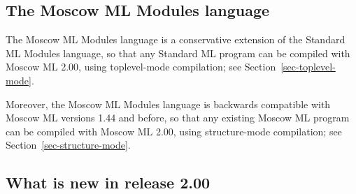 \documentclass[fleqn]{article}
\begin{document}
\subsection{The Moscow ML Modules language}

The Moscow ML Modules language is a conservative extension of the
Standard ML Modules language, so that any Standard ML program can be
compiled with Moscow ML 2.00, using toplevel-mode compilation; see
Section~\ref{sec-toplevel-mode}.

Moreover, the Moscow ML Modules language is backwards compatible with
Moscow ML versions 1.44 and before, so that any existing Moscow ML
program can be compiled with Moscow ML 2.00, using structure-mode
compilation; see Section~\ref{sec-structure-mode}.


\subsection{What is new in release 2.00}
\end{document}
